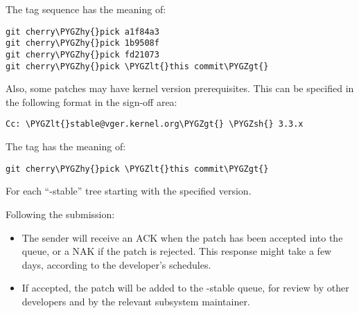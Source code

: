 \documentclass[a4paper,8pt,english]{sphinxmanual}
\def\PYGZlt{\char`\<}
\def\PYGZgt{\char`\>}
\def\PYGZsh{\char`\#}
\def\PYGZhy{\char`\-}
\begin{document}
The tag sequence has the meaning of:

\begin{Verbatim}[commandchars=\\\{\}]
git cherry\PYGZhy{}pick a1f84a3
git cherry\PYGZhy{}pick 1b9508f
git cherry\PYGZhy{}pick fd21073
git cherry\PYGZhy{}pick \PYGZlt{}this commit\PYGZgt{}
\end{Verbatim}

Also, some patches may have kernel version prerequisites.  This can be
specified in the following format in the sign-off area:

\begin{Verbatim}[commandchars=\\\{\}]
Cc: \PYGZlt{}stable@vger.kernel.org\PYGZgt{} \PYGZsh{} 3.3.x
\end{Verbatim}

The tag has the meaning of:

\begin{Verbatim}[commandchars=\\\{\}]
git cherry\PYGZhy{}pick \PYGZlt{}this commit\PYGZgt{}
\end{Verbatim}

For each ``-stable'' tree starting with the specified version.

Following the submission:
\begin{itemize}
\item {} 
The sender will receive an ACK when the patch has been accepted into the
queue, or a NAK if the patch is rejected.  This response might take a few
days, according to the developer's schedules.

\item {} 
If accepted, the patch will be added to the -stable queue, for review by
other developers and by the relevant subsystem maintainer.

\end{itemize}
\end{document}

